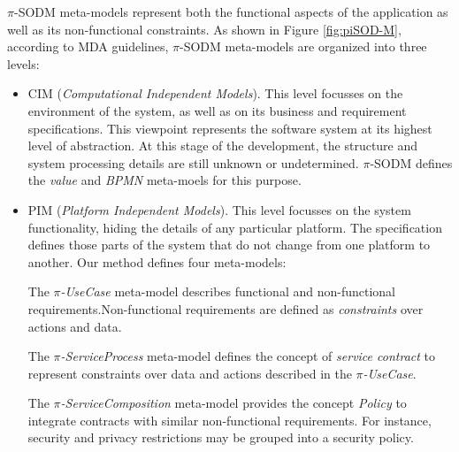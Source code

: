 $\pi$-SODM meta-models represent both the functional aspects of the application as well as its non-functional constraints.
As shown in Figure \ref{fig:piSOD-M}, according to MDA guidelines, $\pi$-SODM meta-models are organized into three levels: 
\begin{itemize}
\item CIM (\textit{Computational Independent Models}). This level focusses on the
environment of the system, as well as on its business and requirement specifications.
This viewpoint represents the software system at its highest level of abstraction.
At this stage of the development, the structure and system processing details are still unknown or undetermined.  $\pi$-SODM defines the \textit{value}
and \textit{BPMN} meta-moels for this purpose. 

 \item PIM (\textit{Platform Independent Models}). This level focusses on the system functionality, hiding the details of any particular platform.
The specification defines those parts of the system that do not change from one platform to another. Our method defines four meta-models: 

 The \textit{$\pi$-UseCase} meta-model describes functional and non-functional requirements.Non-functional requirements are defined as \textit{constraints} over actions and data.
 
The \textit{$\pi$-ServiceProcess} meta-model defines the concept of \textit{service contract} to represent constraints over data and actions 
described in the \textit{$\pi$-UseCase}.

The \textit{$\pi$-ServiceComposition} meta-model provides the concept  \textit{Policy}
to integrate contracts with similar non-functional requirements.
For instance, security and privacy restrictions may be grouped into a security policy.
 

\end{itemize}
